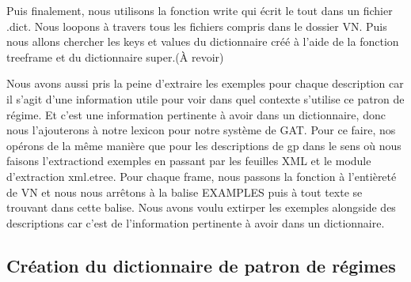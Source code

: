 Puis finalement, nous  utilisons la fonction write qui écrit le tout dans un fichier .dict. Nous loopons à travers tous les fichiers compris dans le dossier VN. Puis nous allons chercher les keys et values du dictionnaire créé à l'aide de la fonction treeframe et du dictionnaire super.(À revoir)

Nous avons aussi pris la peine d'extraire les exemples pour chaque description car il s'agit d'une information utile pour voir dans quel contexte s'utilise ce patron de régime. Et c'est une information pertinente à avoir dans un dictionnaire, donc nous l'ajouterons à notre lexicon pour notre système de GAT. Pour ce faire, nos opérons de la même manière que pour les descriptions de gp dans le sens où nous faisons l'extractiond exemples en passant par les feuilles XML et le module d'extraction xml.etree. Pour chaque frame, nous passons la fonction à l'entièreté de VN et nous nous arrêtons à la balise EXAMPLES puis à tout texte se trouvant dans cette balise. Nous avons voulu extirper les exemples alongside des descriptions car c'est de l'information pertinente à avoir dans un dictionnaire.

\subsection{Création du dictionnaire de patron de régimes}

